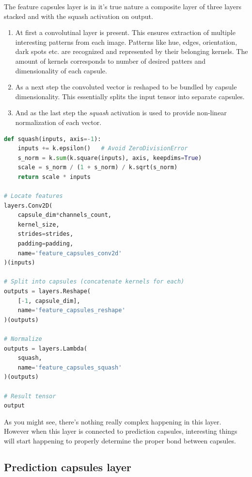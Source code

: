 The feature capsules layer is in it's true nature a composite layer of three layers stacked and with the squash activation on output.

\begin{enumerate}
    \item At first a convolutinal layer is present. This ensures extraction of multiple interesting patterns from each image. Patterns like hue, edges, orientation, dark spots etc. are recognized and represented by their belonging kernels. The amount of kernels corresponds to number of desired patters and dimensionality of each capsule.
    \item As a next step the convoluted vector is reshaped to be bundled by capsule dimensionality. This essentially splits the input tensor into separate capsules.
    \item And as the last step the \textit{squash} activation is used to provide non-linear normalization of each vector.
\end{enumerate}


\begin{lstlisting}[language=Python, caption=Features capsule with squash activation]
def squash(inputs, axis=-1):
    inputs += k.epsilon()   # Avoid ZeroDivisionError
    s_norm = k.sum(k.square(inputs), axis, keepdims=True)
    scale = s_norm / (1 + s_norm) / k.sqrt(s_norm)
    return scale * inputs

# Locate features
layers.Conv2D(
    capsule_dim*channels_count,
    kernel_size,
    strides=strides,
    padding=padding,
    name='feature_capsules_conv2d'
)(inputs)

# Split into capsules (concatenate kernels for each)
outputs = layers.Reshape(
    [-1, capsule_dim],
    name='feature_capsules_reshape'
)(outputs)

# Normalize
outputs = layers.Lambda(
    squash,
    name='feature_capsules_squash'
)(outputs)

# Result tensor
output
\end{lstlisting}

As you might see, there's nothing really complex happening in this layer. However when this layer is connected to prediction capsules, interesting things will start happening to properly determine the proper bond between capsules.

\subsection{Prediction capsules layer}

